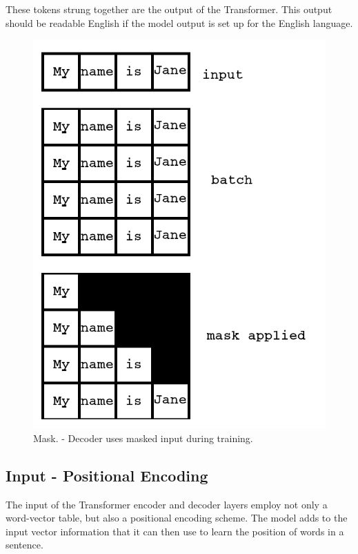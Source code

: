 These tokens strung together are the output of the Transformer. This output should be readable English if the model output is set up for the English language.

\begin{figure}[H]
	\begin{center}
		
		
		\includegraphics[scale=1.25]{diagram-mask01}
	\end{center}
	\caption[Decoder Mask]{Mask. - Decoder uses masked input during training.}
	
	
\end{figure}



\subsection{Input - Positional Encoding}
The input of the Transformer encoder and decoder layers employ not only a word-vector table, but also a positional encoding scheme. The model adds to the input vector information that it can then use to learn the position of words in a sentence. 

